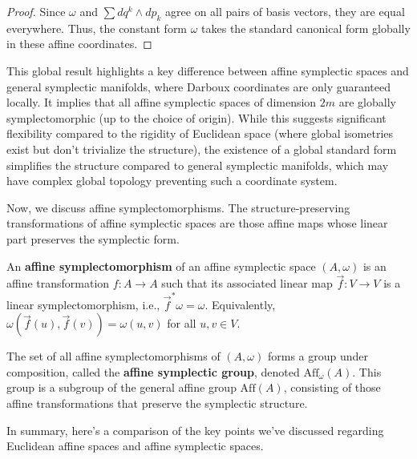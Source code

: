 \begin{proof}
Since $\omega$ and $\sum dq^k \wedge dp_k$ agree on all pairs of basis vectors, they are equal everywhere. Thus, the constant form $\omega$ takes the standard canonical form globally in these affine coordinates.
\end{proof}

This global result highlights a key difference between affine symplectic spaces and general symplectic manifolds, where Darboux coordinates are only guaranteed locally. It implies that all affine symplectic spaces of dimension $2m$ are globally symplectomorphic (up to the choice of origin). While this suggests significant flexibility compared to the rigidity of Euclidean space (where global isometries exist but don't trivialize the structure), the existence of a global standard form simplifies the structure compared to general symplectic manifolds, which may have complex global topology preventing such a coordinate system.

Now, we discuss affine symplectomorphisms. The structure-preserving transformations of affine symplectic spaces are those affine maps whose linear part preserves the symplectic form.

\begin{definition} \label{def:affine_symplectomorphism}
An \textbf{affine symplectomorphism} of an affine symplectic space $(A, \omega)$ is an affine transformation $f: A \to A$ such that its associated linear map $\vec{f}: V \to V$ is a linear symplectomorphism, i.e., $\vec{f}^* \omega = \omega$. Equivalently, $\omega(\vec{f}(u), \vec{f}(v)) = \omega(u, v)$ for all $u, v \in V$.
\end{definition}

\begin{definition} \label{def:affine_symplectic_group}
The set of all affine symplectomorphisms of $(A, \omega)$ forms a group under composition, called the \textbf{affine symplectic group}, denoted $\text{Aff}_\omega(A)$. This group is a subgroup of the general affine group $\text{Aff}(A)$, consisting of those affine transformations that preserve the symplectic structure.
\end{definition}

In summary, here's a comparison of the key points we've discussed regarding Euclidean affine spaces and affine symplectic spaces.


